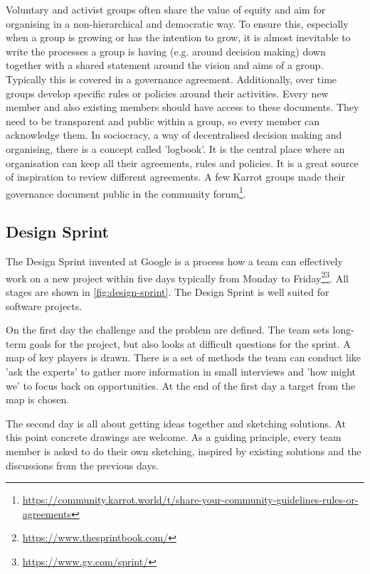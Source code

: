 \documentclass[
	a4paper,%
	11pt,%
	]{article}
\begin{document}
Voluntary and activist groups often share the value of equity and aim for organising in a non-hierarchical and democratic way. To ensure this, especially when a group is growing or has the intention to grow, it is almost inevitable to write the processes a group is having (e.g. around decision making) down together with a shared statement around the vision and aims of a group. Typically this is covered in a governance agreement. Additionally, over time groups develop specific rules or policies around their activities. Every new member and also existing members should have access to these documents. They need to be transparent and public within a group, so every member can acknowledge them. In sociocracy, a way of decentralised decision making and organising, there is a concept called 'logbook'. It is the central place where an organisation can keep all their agreements, rules and policies. It is a great source of inspiration to review different agreements. A few Karrot groups made their governance document public in the community forum\footnote{\label{url:share_agreements2}\href{https://community.karrot.world/t/share-your-community-guidelines-rules-or-agreements}{https://community.karrot.world/t/share-your-community-guidelines-rules-or-agreements}}.
\subsection{Design Sprint}

The Design Sprint invented at Google is a process how a team can effectively work on a new project within five days typically from Monday to Friday\footnote{\label{url:google_sprint}\url{https://www.thesprintbook.com/}}\footnote{\label{url:google_sprint_gv}\url{https://www.gv.com/sprint/}}. All stages are shown in \autoref{fig:design-sprint}. The Design Sprint is well suited for software projects.

On the first day the challenge and the problem are defined. The team sets long-term goals for the project, but also looks at difficult questions for the sprint. A map of key players is drawn.  There is a set of methods the team can conduct like 'ask the experts' to gather more information in small interviews and 'how might we' to focus back on opportunities. At the end of the first day a target from the map is chosen.

The second day is all about getting ideas together and sketching solutions. At this point concrete drawings are welcome. As a guiding principle, every team member is asked to do their own sketching, inspired by existing solutions and the discussions from the previous days.
\end{document}
